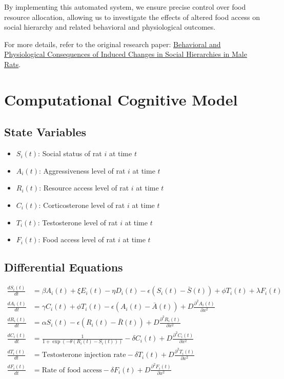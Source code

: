 \documentclass[english, a4paper, 11pt]{article}
\begin{document}
By implementing this automated system, we ensure precise control over food resource allocation, allowing us to investigate the effects of altered food access on social hierarchy and related behavioral and physiological outcomes.

For more details, refer to the original research paper: \href{https://www.biorxiv.org/content/10.1101/2020.11.13.379719v1.full}{Behavioral and Physiological Consequences of Induced Changes in Social Hierarchies in Male Rats}.

\section*{Computational Cognitive Model}
\subsection*{State Variables}
\begin{itemize}
    \item \( S_i(t) \): Social status of rat \( i \) at time \( t \)
    \item \( A_i(t) \): Aggressiveness level of rat \( i \) at time \( t \)
    \item \( R_i(t) \): Resource access level of rat \( i \) at time \( t \)
    \item \( C_i(t) \): Corticosterone level of rat \( i \) at time \( t \)
    \item \( T_i(t) \): Testosterone level of rat \( i \) at time \( t \)
    \item \( F_i(t) \): Food access level of rat \( i \) at time \( t \)
\end{itemize}

\subsection*{Differential Equations}
\begin{align*}
    \frac{dS_i(t)}{dt} & = \beta A_i(t) + \xi E_i(t) - \eta D_i(t) - \epsilon (S_i(t) - \bar{S}(t)) + \phi T_i(t) + \lambda F_i(t)  \\
    \frac{dA_i(t)}{dt} & = \gamma C_i(t) + \phi T_i(t) - \epsilon (A_i(t) - \bar{A}(t)) + D \frac{\partial^2 A_i(t)}{\partial x^2}  \\
    \frac{dR_i(t)}{dt} & = \alpha S_i(t) - \epsilon (R_i(t) - \bar{R}(t)) + D \frac{\partial^2 R_i(t)}{\partial x^2}                \\
    \frac{dC_i(t)}{dt} & = \frac{1}{1 + \exp(-\theta (R_i(t) - S_i(t)))} - \delta C_i(t) + D \frac{\partial^2 C_i(t)}{\partial x^2} \\
    \frac{dT_i(t)}{dt} & = \text{Testosterone injection rate} - \delta T_i(t) + D \frac{\partial^2 T_i(t)}{\partial x^2}            \\
    \frac{dF_i(t)}{dt} & = \text{Rate of food access} - \delta F_i(t) + D \frac{\partial^2 F_i(t)}{\partial x^2}
\end{align*}
\end{document}
